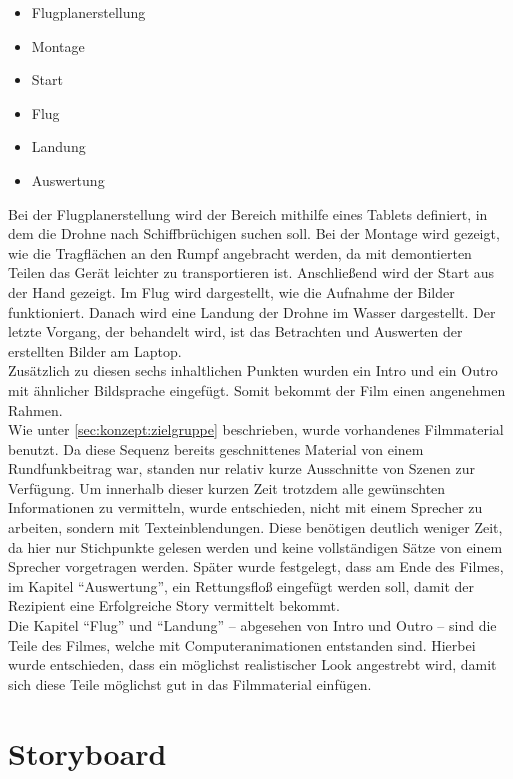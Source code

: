 \begin{itemize}
\setlength\itemsep{0pt}
\item{Flugplanerstellung}
\item{Montage}
\item{Start}
\item{Flug}
\item{Landung}
\item{Auswertung}
\end{itemize}
\noindent
Bei der Flugplanerstellung wird der Bereich mithilfe eines Tablets definiert, in dem die Drohne nach Schiffbrüchigen suchen soll. Bei der Montage wird gezeigt, wie die Tragflächen an den Rumpf angebracht werden, da mit demontierten Teilen das Gerät leichter zu transportieren ist. Anschließend wird der Start aus der Hand gezeigt. Im Flug wird dargestellt, wie die Aufnahme der Bilder funktioniert. Danach wird eine Landung der Drohne im Wasser dargestellt. Der letzte Vorgang, der behandelt wird, ist das Betrachten und Auswerten der erstellten Bilder am Laptop.\\
Zusätzlich zu diesen sechs inhaltlichen Punkten wurden ein Intro und ein Outro mit ähnlicher Bildsprache eingefügt. Somit bekommt der Film einen angenehmen Rahmen.\\
Wie unter \autoref{sec:konzept:zielgruppe} beschrieben, wurde vorhandenes Filmmaterial benutzt. Da diese Sequenz bereits geschnittenes Material von einem Rundfunkbeitrag war, standen nur relativ kurze Ausschnitte von Szenen zur Verfügung. 
Um innerhalb dieser kurzen Zeit trotzdem alle gewünschten Informationen zu vermitteln, wurde entschieden, nicht mit einem Sprecher zu arbeiten, sondern mit Texteinblendungen. Diese benötigen deutlich weniger Zeit, da hier nur Stichpunkte gelesen werden und keine vollständigen Sätze von einem Sprecher vorgetragen werden.
Später wurde festgelegt, dass am Ende des Filmes, im Kapitel ``Auswertung'', ein Rettungsfloß eingefügt werden soll, damit der Rezipient eine Erfolgreiche Story vermittelt bekommt.\\
Die Kapitel ``Flug'' und ``Landung'' -- abgesehen von Intro und Outro -- sind die Teile des Filmes, welche mit Computeranimationen entstanden sind. Hierbei wurde entschieden, dass ein möglichst realistischer Look angestrebt wird, damit sich diese Teile möglichst gut in das Filmmaterial einfügen.

\section{Storyboard} %
\label{sec:konzept:animatic}

